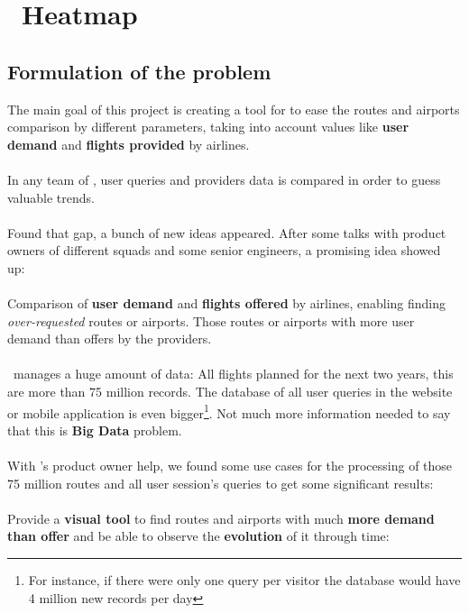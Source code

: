 
\chapter{\company\ Heatmap}

\label{chapter03}


\section{Formulation of the problem} \label{problem}

The main goal of this project is creating a tool for \textit{\company} to ease the routes and airports comparison by different parameters, taking into account values like \textbf{user demand} and \textbf{flights provided} by airlines.
\\\\
In any team of \company, user queries and providers data is compared in order to guess valuable trends.
\\\\
Found that gap, a bunch of new ideas appeared. After some talks with product owners of different squads and some senior engineers, a promising idea showed up:
\\\\
Comparison of \textbf{user demand} and \textbf{flights offered} by airlines, enabling finding \textit{over-requested} routes or airports. Those routes or airports with more user demand than offers by the providers.
\\\\
\squad\ manages a huge amount of data: All flights planned for the next two years, this are more than 75 million records. The database of all user queries in the website or mobile application is even bigger\footnote{For instance, if there were only one query per visitor the database would have 4 million new records per day}. Not much more information needed to say that this is \textbf{Big Data} problem.
\\\\
With \squad's product owner help, we found some use cases for the processing of those 75 million routes and all user session's queries to get some significant results:
\\\\
Provide a \textbf{visual tool} to find routes and airports with much \textbf{more demand than offer} and be able to observe the \textbf{evolution} of it {through time}:

